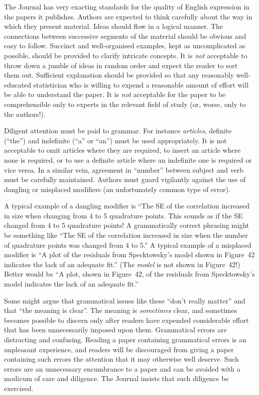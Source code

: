 \documentclass[times, doublespace]{anzsauth}
\begin{document}
The Journal has very exacting standards for the quality of English
expression in the papers it publishes.  Authors are expected to
think carefully about the way in which they present material.
Ideas should flow in a logical manner.  The connections between
successive segments of the material should be obvious and easy to
follow.  Succinct and well-organised examples, kept as uncomplicated
as possible, should be provided to clarify intricate concepts.
It is \emph{not} acceptable to throw down a jumble of ideas in random
order and expect the reader to sort them out.  Sufficient explanation
should be provided so that any reasonably well-educated statistician
who is willing to expend a reasonable amount of effort will be able
to understand the paper.  It is \emph{not} acceptable for the paper
to be comprehensible only to experts in the relevant field of study
(or, worse, only to the authors!).

Diligent attention must be paid to grammar.  For instance
\emph{articles}, definite (``the'') and indefinite (``a'' or
``an'') must be used appropriately.   It is not acceptable to omit
articles where they are required, to insert an article where none
is required, or to use a definite article where an indefinite one is
required or vice versa.  In a similar vein, agreement in ``number''
between subject and verb must be carefully maintained.  Authors must
guard vigilantly against the use of dangling or misplaced modifiers
(an unfortunately common type of error).

A typical example of a dangling modifier is ``The SE of the
correlation increased in size when changing from 4 to 5 quadrature
points.  This sounds as if the SE changed from 4 to 5 quadrature
points!  A grammatically correct phrasing might be something like
``The SE of the correlation increased in size when the number of
quadrature points was changed from 4 to 5.''  A typical example of a
misplaced modifier is ``A plot of the residuals from Specktowsky's
model shown in Figure~42 indicates the lack of an adequate fit.''
(The \emph{model} is not shown in Figure~42!)  Better would be
``A plot, shown in Figure~42, of the residuals from Specktowsky's
model indicates the lack of an adequate fit.''

Some might argue that grammatical issues like these ``don't
really matter'' and that ``the meaning is clear''.  The meaning
is \emph{sometimes} clear, and sometimes becomes  possible to
discern only after readers have expended considerable effort that
has been unnecessarily imposed upon them.  Grammatical errors are
distracting and confusing.  Reading a paper containing grammatical
errors is an unpleasant experience, and readers will be discouraged
from giving a paper containing such errors the attention that it may
otherwise well deserve.  Such errors are an unnecessary encumbrance
to a paper and can be avoided with a modicum of care and diligence.
The Journal insists that such diligence be exercised.
\end{document}
